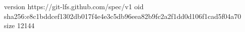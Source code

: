 version https://git-lfs.github.com/spec/v1
oid sha256:e8c1bddcef1302db017f4e4e3c5db96eea82b9fc2a2f1dd0d106f1cad5f04a70
size 12144
